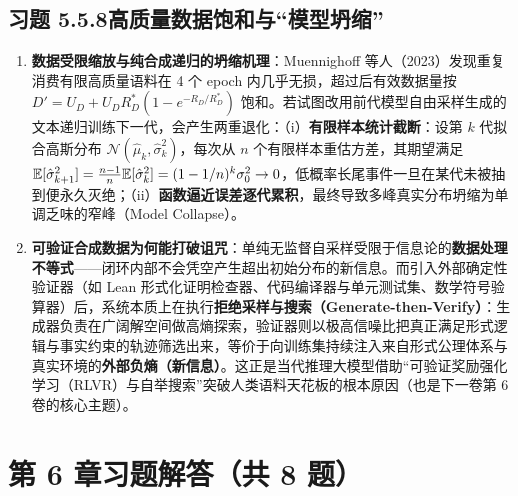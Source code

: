\subsection*{习题 5.5.8\quad 高质量数据饱和与“模型坍缩”}
\begin{enumerate}[label=(\arabic*), leftmargin=1.8em]
  \item \textbf{数据受限缩放与纯合成递归的坍缩机理}：Muennighoff 等人（2023）发现重复消费有限高质量语料在 4 个 epoch 内几乎无损，超过后有效数据量按 $D' = U_D + U_D R_D^*(1 - e^{-R_D / R_D^*})$ 饱和。若试图改用前代模型自由采样生成的文本递归训练下一代，会产生两重退化：（i）\textbf{有限样本统计截断}：设第 $k$ 代拟合高斯分布 $\mathcal{N}(\hat{\mu}_k, \hat{\sigma}_k^2)$，每次从 $n$ 个有限样本重估方差，其期望满足 $\mathbb{E}[\hat{\sigma}_{k+1}^2] = \frac{n-1}{n}\mathbb{E}[\hat{\sigma}_k^2] = (1 - 1/n)^k \sigma_0^2 \to 0$，低概率长尾事件一旦在某代未被抽到便永久灭绝；（ii）\textbf{函数逼近误差逐代累积}，最终导致多峰真实分布坍缩为单调乏味的窄峰（Model Collapse）。
  \item \textbf{可验证合成数据为何能打破诅咒}：单纯无监督自采样受限于信息论的\textbf{数据处理不等式}——闭环内部不会凭空产生超出初始分布的新信息。而引入外部确定性验证器（如 Lean 形式化证明检查器、代码编译器与单元测试集、数学符号验算器）后，系统本质上在执行\textbf{拒绝采样与搜索（Generate-then-Verify）}：生成器负责在广阔解空间做高熵探索，验证器则以极高信噪比把真正满足形式逻辑与事实约束的轨迹筛选出来，等价于向训练集持续注入来自形式公理体系与真实环境的\textbf{外部负熵（新信息）}。这正是当代推理大模型借助“可验证奖励强化学习（RLVR）与自举搜索”突破人类语料天花板的根本原因（也是下一卷第 6 卷的核心主题）。
\end{enumerate}

\section*{第 6 章习题解答（共 8 题）}

